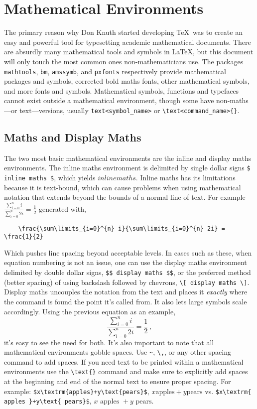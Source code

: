 \chapter{Mathematical Environments}
%
The primary reason why Don Knuth started developing \TeX~was to create
an easy and powerful tool for typesetting academic mathematical
documents.  There are absurdly many mathematical tools and symbols in
\LaTeX, but this document will only touch the most common ones
non-mathematicians use.  The packages \verb|mathtools|, \verb|bm|,
\verb|amssymb|, and \verb|pxfonts| respectively provide mathematical
packages and symbols, corrected bold maths fonts, other mathematical
symbols, and more fonts and symbols.  Mathematical symbols, functions
and typefaces cannot exist outside a mathematical environment, though
some have non-maths---or text---versions, usually
\verb|text<symbol_name>| or \verb|\text<command_name>{}|.
%
\section{Maths and Display Maths}
%
The two most basic mathematical environments are the inline and
display maths environments.  The inline maths environment is delimited
by single dollar signs \verb|$ inline maths $|, which yields
$ inline maths $.  Inline maths has its limitations because it is
text-bound, which can cause problems when using mathematical notation
that extends beyond the bounds of a normal line of text.  For example
$ \frac{\sum\limits_{i=0}^{n} i}{\sum\limits_{i=0}^{n} 2i} =
\frac{1}{2} $ generated with,
\begin{verbatim}
	\frac{\sum\limits_{i=0}^{n} i}{\sum\limits_{i=0}^{n} 2i} = \frac{1}{2}
\end{verbatim}
Which pushes line spacing beyond acceptable levels.  In cases such as
these, when equation numbering is not an issue, one can use the
display maths environment delimited by double dollar signs,
\verb|$$ display maths $$|, or the preferred method (better spacing)
of using backslash followed by chevrons, \verb|\[ display maths \]|.
Display maths uncouples the notation from the text and places it
\emph{exactly} where the command is found the point it's called
from.  It also lets large symbols scale accordingly.  Using the previous
equation as an example,
\[ \frac{\sum\limits_{i=0}^{n} i}{\sum\limits_{i=0}^{n} 2i} =
  \frac{1}{2}\,, \]
it's easy to see the need for both.  It's also important to note that
all mathematical environments gobble spaces.  Use \verb|~|, \verb|\,|,
or any other spacing command to add spaces.  If you need text to be
printed within a mathematical environments use the \verb|\text{}|
command and make sure to explicitly add spaces at the beginning and
end of the normal text to ensure proper spacing.  For example:
\verb|$x\textrm{apples}+y\text{pears}$|,
$x\textrm{apples}+y\text{pears}$ vs.
\verb|$x\textrm{ apples }+y\text{ pears}$|,
$x\textrm{ apples }+y\text{ pears}$.
%

